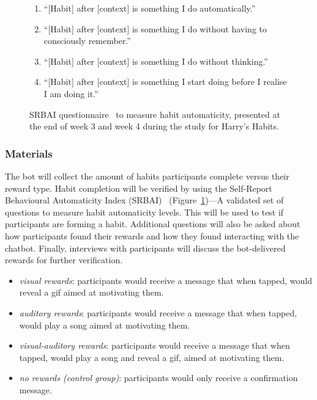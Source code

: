 \begin{figure}[H]
  \centering
  \begin{enumerate}
    \item ``[Habit] after [context] is something I do automatically.''
    \item ``[Habit] after [context] is something I do without having to consciously remember.''
    \item ``[Habit] after [context] is something I do without thinking.''
    \item ``[Habit] after [context]  is something I start doing before I realise I am doing it.''
  \end{enumerate}
  \caption{SRBAI questionnaire~\cite{article_4q_SRBAI} to measure habit automaticity, presented at the end of week 3 and week 4 during the study for Harry's Habits.}
  \label{fig:srbai_questionnaire}
\end{figure}

\subsubsection{Materials}
The bot will collect the amount of habits participants complete versus their reward type. Habit completion will be verified by using the Self-Report Behavioural Automaticity Index (SRBAI)~\cite{article_4q_SRBAI} (Figure~\ref{fig:srbai_questionnaire})---A validated set of questions to measure habit automaticity levels. This will be used to test if participants are forming a habit. Additional questions will also be asked about how participants found their rewards and how they found interacting with the chatbot. Finally, interviews with participants will discuss the bot-delivered rewards for further verification.

\begin{itemize}
\item \textit{visual rewards}: participants would receive a message that when tapped, would reveal a gif aimed at motivating them.
\item \textit{auditory rewards}: participants would receive a message that when tapped, would play a song aimed at motivating them.
\item \textit{visual-auditory rewards}: participants would receive a message that when tapped, would play a song and reveal a gif, aimed at motivating them.
\item \textit{no rewards (control group)}: participants would only receive a confirmation message.
\end{itemize}

